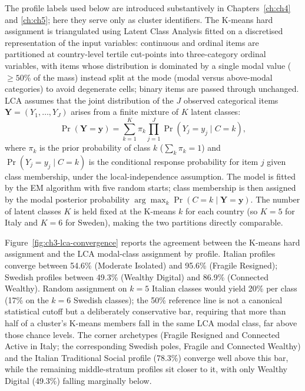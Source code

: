 The profile labels used below are introduced substantively in Chapters~\ref{ch:ch4} and \ref{ch:ch5}; here they serve only as cluster identifiers. The K-means hard assignment is triangulated using Latent Class Analysis fitted on a discretised representation of the input variables: continuous and ordinal items are partitioned at country-level tertile cut-points into three-category ordinal variables, with items whose distribution is dominated by a single modal value ($\geq 50\%$ of the mass) instead split at the mode (modal versus above-modal categories) to avoid degenerate cells; binary items are passed through unchanged. LCA assumes that the joint distribution of the $J$ observed categorical items $\mathbf{Y} = (Y_1,\ldots,Y_J)$ arises from a finite mixture of $K$ latent classes:
\begin{equation}
  \Pr(\mathbf{Y} = \mathbf{y}) = \sum_{k=1}^{K} \pi_k \prod_{j=1}^{J} \Pr(Y_j = y_j \mid C = k),
\end{equation}
where $\pi_k$ is the prior probability of class $k$ ($\sum_k \pi_k = 1$) and $\Pr(Y_j = y_j \mid C = k)$ is the conditional response probability for item $j$ given class membership, under the local-independence assumption. The model is fitted by the EM algorithm \citep{vermuntmagidson2002} with five random starts; class membership is then assigned by the modal posterior probability $\arg\max_k \Pr(C = k \mid \mathbf{Y} = \mathbf{y})$. The number of latent classes $K$ is held fixed at the K-means $k$ for each country (so $K = 5$ for Italy and $K = 6$ for Sweden), making the two partitions directly comparable.

Figure~\ref{fig:ch3-lca-convergence} reports the agreement between the K-means hard assignment and the LCA modal-class assignment by profile. Italian profiles converge between 54.6\% (Moderate Isolated) and 95.6\% (Fragile Resigned); Swedish profiles between 49.3\% (Wealthy Digital) and 86.9\% (Connected Wealthy). Random assignment on $k = 5$ Italian classes would yield 20\% per class (17\% on the $k = 6$ Swedish classes); the 50\% reference line is not a canonical statistical cutoff but a deliberately conservative bar, requiring that more than half of a cluster's K-means members fall in the same LCA modal class, far above those chance levels. The corner archetypes (Fragile Resigned and Connected Active in Italy; the corresponding Swedish poles, Fragile and Connected Wealthy) and the Italian Traditional Social profile (78.3\%) converge well above this bar, while the remaining middle-stratum profiles sit closer to it, with only Wealthy Digital (49.3\%) falling marginally below.

